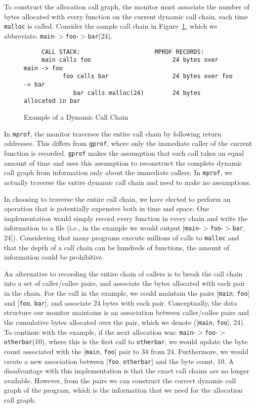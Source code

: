 To construct the allocation call graph, the monitor must associate the
number of bytes allocated with every function on the current dynamic
call chain, each time {\tt malloc} is called.  Consider the sample
call chain in Figure~\ref{cchain:fig}, which we abbreviate:
{\tt main}-$>${\tt foo}-$>${\tt bar}(24).

\begin{figure}[htbp]
\begin{verbatim}
     CALL STACK:                     MPROF RECORDS:
     main calls foo                       24 bytes over main -> foo
           foo calls bar                  24 bytes over foo -> bar
              bar calls malloc(24)        24 bytes allocated in bar
\end{verbatim}
\caption{Example of a Dynamic Call Chain}
\label{cchain:fig}
\end{figure}

In {\tt mprof}, the monitor traverses the entire call chain by
following return addresses.  This differs from {\tt gprof}, where only
the immediate caller of the current function is recorded.  {\tt gprof}
makes the assumption that each call takes an equal amount of time and
uses this assumption to reconstruct the complete dynamic call graph
from information only about the immediate callers.  In {\tt mprof}, we
actually traverse the entire dynamic call chain and need to make no
assumptions. 

In choosing to traverse the entire call chain, we have elected to
perform an operation that is potentially expensive both in time and
space.  One implementation would simply record every function in every
chain and write the information to a file (i.e., in the example we
would output [{\tt main}-$>${\tt foo}-$>${\tt bar}, 24]).  Considering that
many programs execute millions of calls to {\tt malloc} and that the
depth of a call chain can be hundreds of functions, the amount of
information could be prohibitive.

An alternative to recording the entire chain of callers is to break
the call chain into a set of caller/callee pairs, and associate the
bytes allocated with each pair in the chain.  For the call in the
example, we could maintain the pairs [{\tt main}, {\tt foo}] and [{\tt foo},
{\tt bar}], and associate 24 bytes with each pair.  Conceptually, the
data structure our monitor maintains is an association between
caller/callee pairs and the cumulative bytes allocated over the pair,
which we denote ([{\tt main}, {\tt foo}], 24).  To continue with the
example, if the next allocation was: {\tt main}-$>${\tt foo}-$>${\tt
otherbar}(10), where this is the first call to {\tt otherbar}, we
would update the byte count associated with the [{\tt main}, {\tt foo}] pair
to 34 from 24.  Furthermore, we would create a new association between
[{\tt foo}, {\tt otherbar}] and the byte count, 10.  A disadvantage
with this implementation is that the exact call chains are no longer
available.  However, from the pairs we can construct the correct
dynamic call graph of the program, which is the information that we
need for the allocation call graph.

